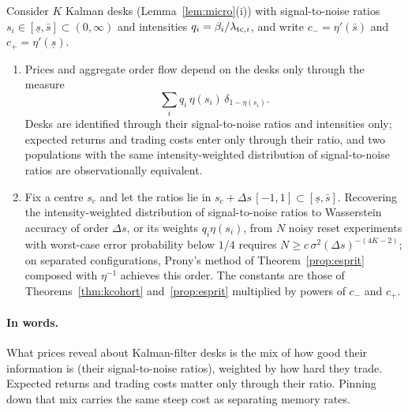 \begin{proposition}\label{prop:primitives}
Consider $K$ Kalman desks (Lemma~\ref{lem:micro}(i)) with signal-to-noise ratios $s_i\in[\underline s,\bar s]\subset(0,\infty)$ and intensities $q_i=\beta_i/\lambda_{{\rm tc},i}$, and write $c_-=\eta'(\bar s)$ and $c_+=\eta'(\underline s)$.
\begin{enumerate}[label=(\roman*)]
\item Prices and aggregate order flow depend on the desks only through the measure
\[
\sum_iq_i\,\eta(s_i)\,\delta_{1-\eta(s_i)}.
\]
Desks are identified through their signal-to-noise ratios and intensities only; expected returns and trading costs enter only through their ratio, and two populations with the same intensity-weighted distribution of signal-to-noise ratios are observationally equivalent.
\item Fix a centre $s_c$ and let the ratios lie in $s_c+\Delta s\,[-1,1]\subset[\underline s,\bar s]$. Recovering the intensity-weighted distribution of signal-to-noise ratios to Wasserstein accuracy of order $\Delta s$, or its weights $q_i\eta(s_i)$, from $N$ noisy reset experiments with worst-case error probability below $1/4$ requires $N\ge c\,\sigma^2(\Delta s)^{-(4K-2)}$; on separated configurations, Prony's method of Theorem~\ref{prop:esprit} composed with $\eta^{-1}$ achieves this order. The constants are those of Theorems~\ref{thm:kcohort} and~\ref{prop:esprit} multiplied by powers of $c_-$ and $c_+$.
\end{enumerate}
\end{proposition}

\paragraph{In words.} What prices reveal about Kalman-filter desks is the mix of how good their information is (their signal-to-noise ratios), weighted by how hard they trade. Expected returns and trading costs matter only through their ratio. Pinning down that mix carries the same steep cost as separating memory rates.

